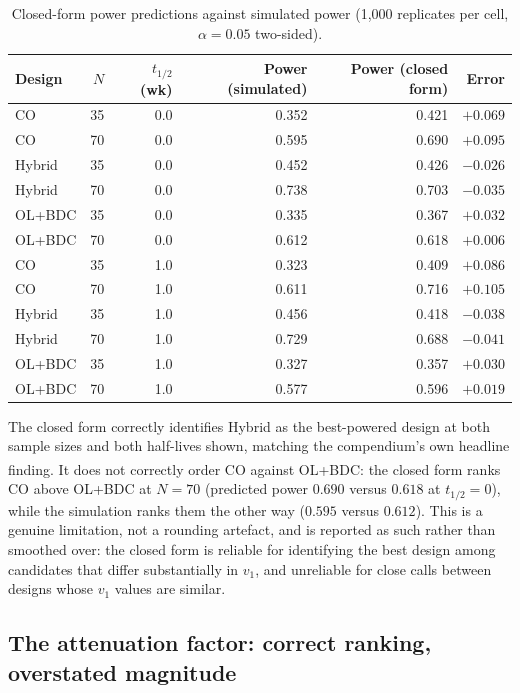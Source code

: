 \documentclass[
  11pt,
]{article}
\begin{document}
\begin{table}[H]
\centering
\caption{Closed-form power predictions against simulated power (1{,}000 replicates per cell, $\alpha=0.05$ two-sided).}
\label{tab:power-fit}

\begin{tabular}{lrrrrr}
\toprule
Design & $N$ & $t_{1/2}$ (wk) & Power (simulated) & Power (closed form) & Error\\
\midrule
CO & 35 & 0.0 & 0.352 & 0.421 & $+0.069$\\
CO & 70 & 0.0 & 0.595 & 0.690 & $+0.095$\\
Hybrid & 35 & 0.0 & 0.452 & 0.426 & $-0.026$\\
Hybrid & 70 & 0.0 & 0.738 & 0.703 & $-0.035$\\
OL+BDC & 35 & 0.0 & 0.335 & 0.367 & $+0.032$\\
OL+BDC & 70 & 0.0 & 0.612 & 0.618 & $+0.006$\\
CO & 35 & 1.0 & 0.323 & 0.409 & $+0.086$\\
CO & 70 & 1.0 & 0.611 & 0.716 & $+0.105$\\
Hybrid & 35 & 1.0 & 0.456 & 0.418 & $-0.038$\\
Hybrid & 70 & 1.0 & 0.729 & 0.688 & $-0.041$\\
OL+BDC & 35 & 1.0 & 0.327 & 0.357 & $+0.030$\\
OL+BDC & 70 & 1.0 & 0.577 & 0.596 & $+0.019$\\
\bottomrule
\end{tabular}
\end{table}

The closed form correctly identifies Hybrid as the best-powered
design at both sample sizes and both half-lives shown, matching the
compendium's own headline finding\textsuperscript{}. It does not
correctly order CO against OL+BDC: the closed form ranks CO above
OL+BDC at \(N=70\) (predicted power
\(0.690\) versus
\(0.618\) at
\(t_{1/2}=0\)), while the simulation ranks them the other way
(\(0.595\)
versus \(0.612\)). This is a genuine
limitation, not a rounding
artefact, and is reported as such rather than smoothed over: the
closed form is reliable for identifying the best design among
candidates that differ substantially in \(v_1\), and unreliable for
close calls between designs whose \(v_1\) values are similar.

\subsection{The attenuation factor: correct ranking, overstated magnitude}\label{the-attenuation-factor-correct-ranking-overstated-magnitude}
\end{document}
